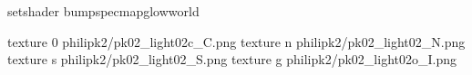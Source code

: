 setshader bumpspecmapglowworld


texture 0 philipk2/pk02_light02c_C.png
texture n philipk2/pk02_light02_N.png
texture s philipk2/pk02_light02_S.png
texture g philipk2/pk02_light02o_I.png
